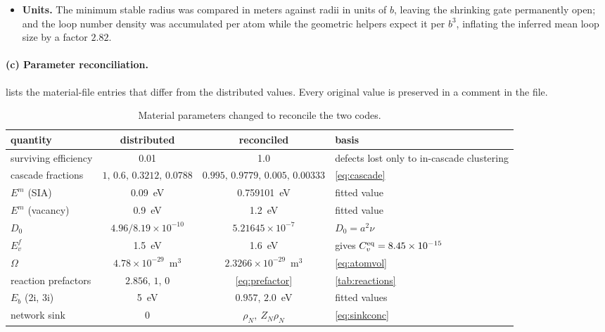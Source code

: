 \documentclass{article}
\newcommand{\cloop}{\ensuremath{\langle c\rangle}}
\newcommand{\bvec}{\bm b}
\newcommand{\nvec}{\bm n}
\begin{document}
\begin{itemize}
\cloop{} loop is built with $\bvec\!\cdot\!\nvec=c/2$ in every one of the four
places that value appears. \textbf{A hard-coded ideal $c/a$ elsewhere made that
change a silent no-op}, and the failure mode is worth recording: the basal-loop
generator chose its branch by comparing the plane spacing against $\sqrt{8/3}$,
so with the physical ratio present the spacing matched neither branch and every
requested basal loop vanished with no message and no non-zero exit code. The
ratio is now taken from the lattice basis itself, and the fall-through throws.
\item \textbf{Units.} The minimum stable radius was compared in meters against
radii in units of $b$, leaving the shrinking gate permanently open; and the loop
number density was accumulated per atom while the geometric helpers expect it per
$b^3$, inflating the inferred mean loop size by a factor $2.82$.
\end{itemize}

\paragraph*{(c) Parameter reconciliation.}  lists the
material-file entries that differ from the distributed values. Every original
value is preserved in a comment in the file.

\begin{table}[htbp]
\centering
\caption{Material parameters changed to reconcile the two codes.}
\label{tab:params}
\footnotesize
\begin{tabular}{@{}lccp{}@{}}
\toprule
quantity & distributed & reconciled & basis \\
\midrule
surviving efficiency & 0.01 & 1.0 & defects lost only to in-cascade clustering \\
cascade fractions & $1,\,0.6,\,0.3212,\,0.0788$ & $0.995,\,0.9779,\,0.005,\,0.00333$ & \cref{eq:cascade} \\
$E^m$ (SIA) & 0.09~eV & 0.759101~eV & fitted value \\
$E^m$ (vacancy) & 0.9~eV & 1.2~eV & fitted value \\
$D_0$ & $4.96/8.19\times10^{-10}$ & $5.21645\times 10^{-7}$ & $D_0 = a^2\nu$ \\
$E^f_v$ & 1.5~eV & 1.6~eV & gives $C_v^{\rm eq} = 8.45\times10^{-15}$ \\
$\Omega$ & $4.78\times10^{-29}$~m$^3$ & $2.3266\times10^{-29}$~m$^3$ & \cref{eq:atomvol} \\
reaction prefactors & $2.856$, $1$, $0$ & \cref{eq:prefactor} & \cref{tab:reactions} \\
$E_b$ (2i, 3i) & 5~eV & $0.957$, $2.0$~eV & fitted values \\
network sink & $0$ & $\rho_N,\ Z_N\rho_N$ & \cref{eq:sinkconc} \\
\bottomrule
\end{tabular}
\end{table}
\end{document}
